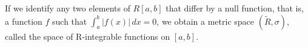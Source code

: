 If we identify any two elements of $R[a,b]$ that differ by a null function, that is, a function $f$ such that $\int_a^b |f(x)| \, dx = 0$, we obtain a metric space $(\tilde{R}, \sigma)$, called the space of R-integrable functions on $[a,b]$.
